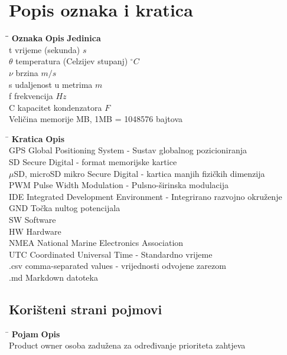 \chapter*{Popis oznaka i kratica}\label{TOA}

\begin{tabbing}\label{Oznake}
\hspace{60pt}\=\hspace{160pt}\=\kill
 \textbf{Oznaka} \>  \textbf{Opis} \> \textbf{Jedinica} \\ 
 t \>  vrijeme (sekunda) \> $s$ \\ 
 $\theta$ \>  temperatura (Celzijev stupanj) \> $^ \circ C$ \\ 
 $\nu$ \>  brzina \> $m/s$ \\ 
 s \>  udaljenost u metrima \> $m$ \\ 
 f \>  frekvencija \> $Hz$ \\ 
 C \>  kapacitet kondenzatora \> $F$ \\ 
  \> Veličina memorije \> MB, 1MB = 1048576 bajtova
\end{tabbing}


\begin{tabbing}
\hspace{80pt}\=\kill
\textbf{Kratica} \> \textbf{Opis} \\ 
 GPS \> Global Positioning System - Sustav globalnog pozicioniranja  \\ 
 SD \> Secure Digital - format memorijske kartice\\ 
 $\mu$SD, microSD \> mikro Secure Digital - kartica manjih fizičkih dimenzija \\ 
 PWM \> Pulse Width Modulation - Pulsno-širinska modulacija \\ 
 IDE \> Integrated Development Environment  - Integrirano razvojno okruženje \\ 
 GND \> Točka nultog potencijala \\ 
 SW \> Software \\ 
 HW \> Hardware \\ 
 NMEA \> National Marine Electronics Association \\ 
 UTC \> Coordinated Universal Time - Standardno vrijeme \\ 
 .csv \> comma-separated values - vrijednosti odvojene zarezom \\ 
 .md \> Markdown datoteka\\
 \end{tabbing} 


\section*{Korišteni strani pojmovi}
\begin{tabbing}
\hspace{100pt}\=\kill
\textbf{Pojam} \> \textbf{Opis} \\ 
 Product owner \> osoba zadužena za određivanje prioriteta zahtjeva \\
\end{tabbing} 